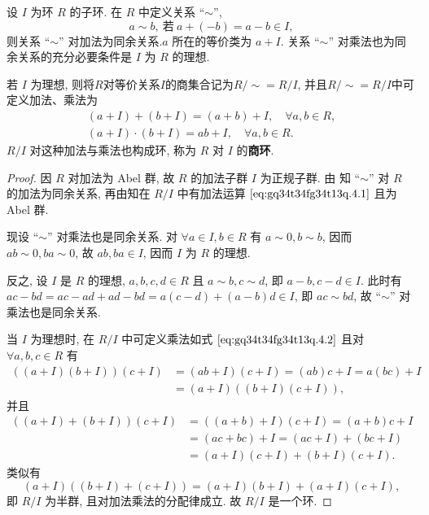 \documentclass[../../main.tex]{subfiles}%
\begin{document}
\begin{theorem}\label{theorem:抽象代数-定理 1.4.1}
设 \( I \) 为环 \( R \) 的子环. 在 \( R \) 中定义关系 “\(\sim\)”,
\[
a \sim b, \ 若\ a + (-b) = a - b \in I,
\]
则关系 “\(\sim\)” 对加法为同余关系.\( a \) 所在的等价类为 \( a + I \).
关系 “\(\sim\)” 对乘法也为同余关系的充分必要条件是 \( I \) 为 \( R \) 的理想.

若 \( I \) 为理想, 则将$R$对等价关系$I$的商集合记为\( R/\sim = R/I \), 并且\( R/\sim = R/I \)中可定义加法、乘法为
\begin{gather}
(a + I) + (b + I) = (a + b) + I, \quad \forall a,b \in R, \label{eq:gq34t34fg34t13q.4.1}
\\
(a + I) \cdot (b + I) = ab + I, \quad \forall a,b \in R. \label{eq:gq34t34fg34t13q.4.2}
\end{gather}
\( R/I \) 对这种加法与乘法也构成环, 称为 \( R \) 对 \( I \) 的\textbf{商环}.
\end{theorem}
\begin{proof}

因 \( R \) 对加法为 Abel 群, 故 \( R \) 的加法子群 \( I \) 为正规子群. 由 知 “\(\sim\)” 对 \( R \) 的加法为同余关系, 再由知在 \( R/I \) 中有加法运算 \(\eqref{eq:gq34t34fg34t13q.4.1}\) 且为 Abel 群.

现设 “\(\sim\)” 对乘法也是同余关系. 对 \( \forall a \in I, b \in R \) 有 \( a \sim 0, b \sim b \), 因而 \( ab \sim 0, ba \sim 0 \), 故 \( ab, ba \in I \), 因而 \( I \) 为 \( R \) 的理想.

反之, 设 \( I \) 是 \( R \) 的理想, \( a,b,c,d \in R \) 且 \( a \sim b, c \sim d \), 即 \( a - b, c - d \in I \). 此时有 \( ac - bd = ac - ad + ad - bd = a(c - d) + (a - b)d \in I \), 即 \( ac \sim bd \), 故 “\(\sim\)” 对乘法也是同余关系.

当 \( I \) 为理想时, 在 \( R/I \) 中可定义乘法如式 \(\eqref{eq:gq34t34fg34t13q.4.2}\) 且对 \( \forall a,b,c \in R \) 有
\begin{align*}
((a + I)(b + I))(c + I) &= (ab + I)(c + I) = (ab)c + I = a(bc) + I \\
&= (a + I)((b + I)(c + I)),
\end{align*}
并且
\begin{align*}
((a + I) + (b + I))(c + I) &= ((a + b) + I)(c + I) 
= (a + b)c + I \\
&= (ac + bc) + I = (ac + I) + (bc + I) \\
&= (a + I)(c + I) + (b + I)(c + I).
\end{align*}
类似有
\[
(a + I)((b + I) + (c + I)) = (a + I)(b + I) + (a + I)(c + I),
\]
即 \( R/I \) 为半群, 且对加法乘法的分配律成立. 故 \( R/I \) 是一个环.

\end{proof}
\end{document}
